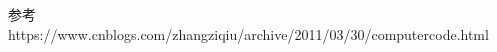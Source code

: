 
\begin{issues}
\issueDraft
\end{issues}




参考 https://www.cnblogs.com/zhangziqiu/archive/2011/03/30/computercode.html
